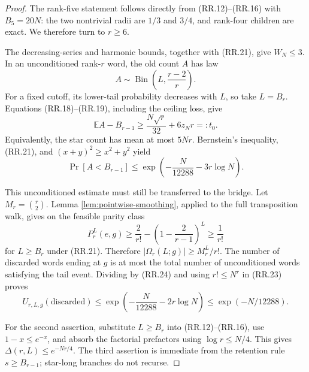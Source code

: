 \begin{proof}
The rank-five statement follows directly from (RR.12)--(RR.16) with
$B_5=20N$: the two nontrivial radii are $1/3$ and $3/4$, and rank-four
children are exact.  We therefore turn to $r\ge6$.

The decreasing-series and harmonic bounds, together with (RR.21), give
$W_N\le3$.  In an unconditioned rank-$r$ word, the old count $A$ has law
\[
  A\sim\operatorname{Bin}\left(L,\frac{r-2}{r}\right).
\]
For a fixed cutoff, its lower-tail probability decreases with $L$, so take
$L=B_r$.  Equations (RR.18)--(RR.19), including the ceiling loss, give
\[
  \mathbb E A-B_{r-1}
  \ge
  \frac{N\sqrt r}{32}+6z_Nr=:t_0.
  \tag{RR.22}
\]
Equivalently, the star count has mean at most $5Nr$.  Bernstein's inequality,
(RR.21), and $(x+y)^2\ge x^2+y^2$ yield
\[
  \Pr[A<B_{r-1}]
  \le
  \exp\!\left(-\frac{N}{12288}-3r\log N\right).
  \tag{RR.23}
\]

This unconditioned estimate must still be transferred to the bridge.  Let
$M_r=\binom r2$.  Lemma \ref{lem:pointwise-smoothing}, applied to the full
transposition walk, gives on the feasible parity class
\[
  P_r^L(e,g)
  \ge
  \frac{2}{r!}
  -
  \left(1-\frac{2}{r-1}\right)^L
  \ge \frac1{r!}
  \tag{RR.24}
\]
for $L\ge B_r$ under (RR.21).  Therefore
$|\Omega_r(L;g)|\ge M_r^L/r!$.  The number of discarded words ending at
$g$ is at most the total number of unconditioned words satisfying the tail
event.  Dividing by (RR.24) and using $r!\le N^r$ in (RR.23) proves
\[
  U_{r,L,g}(\text{discarded})
  \le
  \exp\!\left(-\frac{N}{12288}-2r\log N\right)
  \le \exp(-N/12288).
  \tag{RR.25}
\]

For the second assertion, substitute $L\ge B_r$ into (RR.12)--(RR.16), use
$1-x\le e^{-x}$, and absorb the factorial prefactors using
$\log r\le N/4$.  This gives $\Delta(r,L)\le e^{-Nr/4}$.  The third assertion
is immediate from the retention rule $s\ge B_{r-1}$; star-long branches do
not recurse.
\end{proof}

